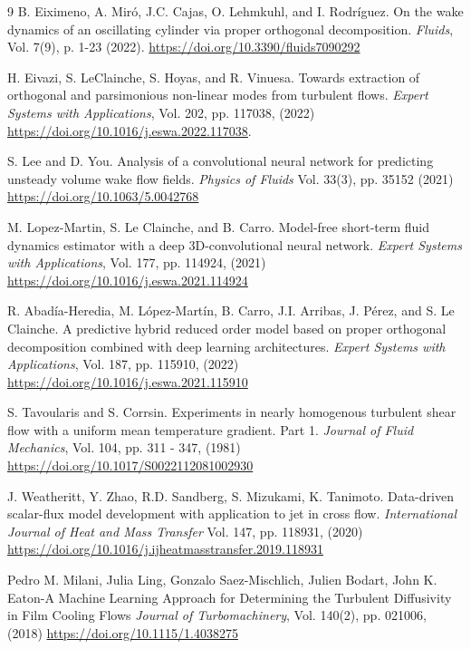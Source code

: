 \documentclass{article}
\begin{document}
\begin{thebibliography}{9}
 B. Eiximeno, A. Miró, J.C. Cajas, O. Lehmkuhl, and I. Rodríguez. On the wake dynamics of an oscillating cylinder via proper orthogonal decomposition. {\it Fluids}, Vol. 7(9), p. 1-23 (2022). \href{https://doi.org/10.3390/fluids7090292}{https://doi.org/10.3390/fluids7090292} 

 H. Eivazi, S. LeClainche, S. Hoyas, and R. Vinuesa. Towards extraction of orthogonal and parsimonious non-linear modes from turbulent flows. {\it Expert Systems with Applications}, Vol. 202, pp. 117038, (2022) \href{https://doi.org/10.1016/j.eswa.2022.117038}{https://doi.org/10.1016/j.eswa.2022.117038}.

 S. Lee and D. You. Analysis of a convolutional neural network for predicting unsteady volume wake flow fields. {\it Physics of Fluids} Vol. 33(3), pp. 35152 (2021) \href{https://doi.org/10.1063/5.0042768}{https://doi.org/10.1063/5.0042768}

 M. Lopez-Martin, S. Le Clainche, and B. Carro. Model-free short-term fluid dynamics estimator with a deep 3D-convolutional neural network. {\it Expert Systems with Applications}, Vol. 177, pp. 114924, (2021) \href{https://doi.org/10.1016/j.eswa.2021.114924}{https://doi.org/10.1016/j.eswa.2021.114924}

 R. Abadía-Heredia, M. López-Martín, B. Carro, J.I. Arribas, J. Pérez, and S. Le Clainche. A predictive hybrid reduced order model based on proper orthogonal decomposition combined with deep learning architectures. {\it Expert Systems with Applications}, Vol. 187, pp. 115910, (2022) \href{https://doi.org/10.1016/j.eswa.2021.115910}{https://doi.org/10.1016/j.eswa.2021.115910}

 S. Tavoularis and S. Corrsin. Experiments in nearly homogenous turbulent shear flow with a uniform mean temperature gradient. Part 1. {\it Journal of Fluid Mechanics}, Vol. 104, pp. 311 - 347, (1981) \href{https://doi.org/10.1017/S0022112081002930}{https://doi.org/10.1017/S0022112081002930}

 J. Weatheritt, Y. Zhao, R.D. Sandberg, S. Mizukami, K. Tanimoto. Data-driven scalar-flux model development with application to jet in cross flow. {\it International Journal of Heat and Mass Transfer} Vol. 147, pp. 118931, (2020) \href{https://doi.org/10.1016/j.ijheatmasstransfer.2019.118931}{https://doi.org/10.1016/j.ijheatmasstransfer.2019.118931}

 Pedro M. Milani, Julia Ling, Gonzalo Saez-Mischlich, Julien Bodart, John K. Eaton-A Machine Learning Approach for Determining the Turbulent Diffusivity in Film Cooling Flows 
{\it Journal of Turbomachinery}, Vol. 140(2), pp. 021006, (2018) \href{https://doi.org/10.1115/1.4038275}{https://doi.org/10.1115/1.4038275}


\end{thebibliography}
\end{document}
